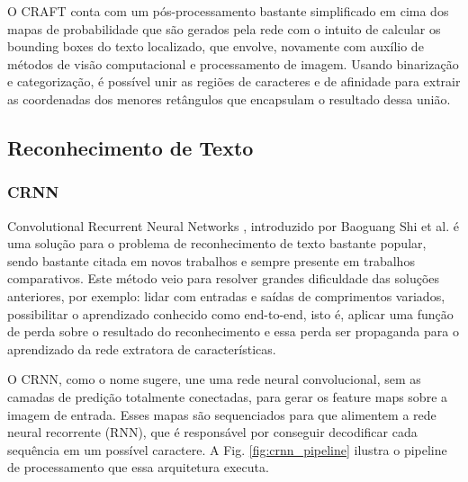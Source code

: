 O CRAFT conta com um pós-processamento bastante simplificado em cima dos mapas de probabilidade que são gerados pela rede com o intuito de calcular os bounding boxes do texto localizado, que envolve, novamente com auxílio de métodos de visão computacional e processamento de imagem. Usando binarização e categorização, é possível unir as regiões de caracteres e de afinidade para extrair as coordenadas dos menores retângulos que encapsulam o resultado dessa união.

\subsection{Reconhecimento de Texto}
\lipsum[25]


\subsubsection{CRNN} \label{crnn}
Convolutional Recurrent Neural Networks \cite{CRNN}, introduzido por Baoguang Shi et al. é uma solução para o problema de reconhecimento de texto bastante popular, sendo bastante citada em novos trabalhos e sempre presente em trabalhos comparativos. Este método veio para resolver grandes dificuldade das soluções anteriores, por exemplo: lidar com entradas e saídas de comprimentos variados, possibilitar o aprendizado conhecido como end-to-end, isto é, aplicar uma função de perda sobre o resultado do reconhecimento e essa perda ser propaganda para o aprendizado da rede extratora de características.

O CRNN, como o nome sugere, une uma rede neural convolucional, sem as camadas de predição totalmente conectadas, para gerar os feature maps sobre a imagem de entrada. Esses mapas são sequenciados para que alimentem a rede neural recorrente (RNN), que é responsável por conseguir decodificar cada sequência em um possível caractere. A Fig. \ref{fig:crnn_pipeline} ilustra o pipeline de processamento que essa arquitetura executa.

